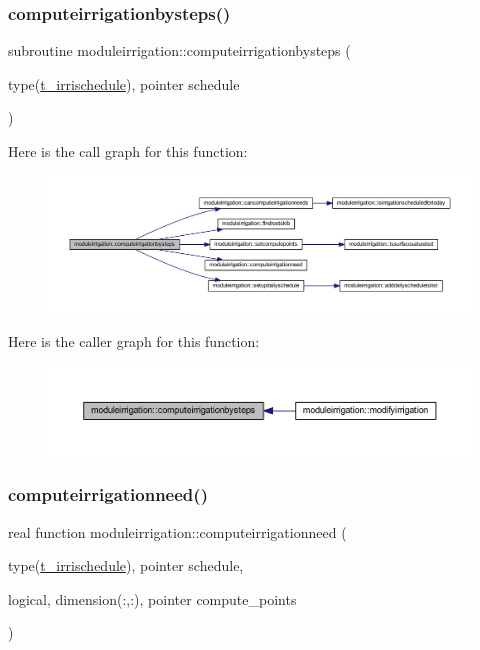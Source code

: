 \subsubsection{\texorpdfstring{computeirrigationbysteps()}{computeirrigationbysteps()}}
{\footnotesize\ttfamily subroutine moduleirrigation\+::computeirrigationbysteps (\begin{DoxyParamCaption}\item[{type(\mbox{\hyperlink{structmoduleirrigation_1_1t__irrischedule}{t\+\_\+irrischedule}}), pointer}]{schedule }\end{DoxyParamCaption})\hspace{0.3cm}{\ttfamily [private]}}

Here is the call graph for this function\+:\nopagebreak
\begin{figure}[H]
\begin{center}
\leavevmode
\includegraphics[width=350pt]{namespacemoduleirrigation_ad1bea8412119ae05c2eb3e177bcaed44_cgraph}
\end{center}
\end{figure}
Here is the caller graph for this function\+:\nopagebreak
\begin{figure}[H]
\begin{center}
\leavevmode
\includegraphics[width=350pt]{namespacemoduleirrigation_ad1bea8412119ae05c2eb3e177bcaed44_icgraph}
\end{center}
\end{figure}
\mbox{\label{namespacemoduleirrigation_ada3092907de79d715950bd53c82fd943}} 
\subsubsection{\texorpdfstring{computeirrigationneed()}{computeirrigationneed()}}
{\footnotesize\ttfamily real function moduleirrigation\+::computeirrigationneed (\begin{DoxyParamCaption}\item[{type(\mbox{\hyperlink{structmoduleirrigation_1_1t__irrischedule}{t\+\_\+irrischedule}}), pointer}]{schedule,  }\item[{logical, dimension(\+:,\+:), pointer}]{compute\+\_\+points }\end{DoxyParamCaption})\hspace{0.3cm}{\ttfamily [private]}}

